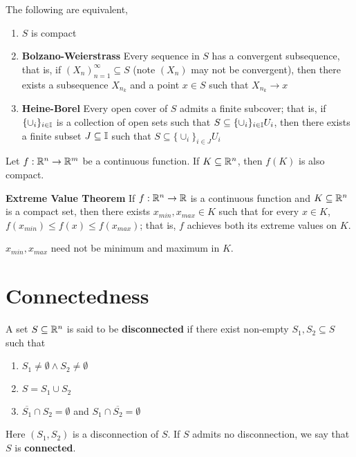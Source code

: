 \documentclass[11pt]{article}
\begin{document}
\begin{theorem}
  \label{equivalent definition of compactness}
  The following are equivalent,

    \begin{enumerate}
      \item $S$ is compact
      \item \textbf{Bolzano-Weierstrass} Every sequence in $S$ has a convergent subsequence, that is, if $(X_n)_{n=1}^{\infty}\subseteq S$ (note $(X_n)$ may not be convergent), then there exists a subsequence $X_{n_k}$ and a point $x\in S$ such that $X_{n_k} \rightarrow x$
      \item \textbf{Heine-Borel} Every open cover of $S$ admits a finite subcover; that is, if $\{\cup_i\}_{i\in\mathbb{I}}$ is a collection of open sets such that $S\subseteq \{\cup_i\}_{i\in\mathbb{I}}{U_i}$, then there exists a finite subset $J\subseteq \mathbb{I}$ such that $S\subseteq \{\cup_i\}_{i\in J}{U_i}$
    \end{enumerate}

\end{theorem}


\begin{theorem}
  \label{continuous preimage of compact sets is compact}
  Let $f: \mathbb{R}^n \rightarrow \mathbb{R}^m$ be a continuous function. If $K\subseteq \mathbb{R}^n$, then $f(K)$ is also compact.
\end{theorem}


\begin{theorem}
  \label{extreme value theorem}
  \textbf{Extreme Value Theorem}
  If $f: \mathbb{R}^n \rightarrow \mathbb{R}$ is a continuous function and $K\subseteq \mathbb{R}^n$ is a compact set, then there exists $x_{min}, x_{max} \in K$ such that for every $x\in K$, $f(x_{min}) \leq f(x)\leq f(x_{max})$; that is, $f$ achieves both its extreme values on $K$.

  \begin{rem}
    $x_{min}, x_{max}$ need not be minimum and maximum in $K$.
  \end{rem}
\end{theorem}


\section*{Connectedness}


\begin{defn}
  \label{disconnected}
  A set $S\subseteq \mathbb{R}^n$ is said to be \textbf{disconnected} if there exist non-empty $S_1, S_2\subseteq S$ such that
  \begin{enumerate}
    \item $S_1\not= \emptyset \land S_2\not= \emptyset$
    \item $S = S_1 \cup S_2$
    \item $\overline{S_1}\cap S_2 = \emptyset$ and $S_1 \cap \overline{S_2} = \emptyset$
  \end{enumerate}
  \label{connectedness}
  Here $(S_1, S_2)$ is a disconnection of $S$. If $S$ admits no disconnection, we say that $S$ is \textbf{connected}.
\end{defn}
\end{document}
